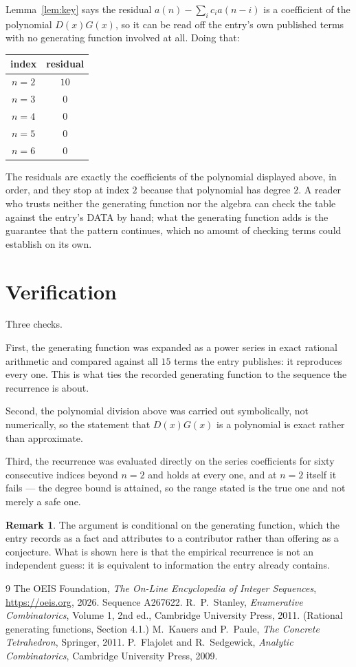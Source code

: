 \documentclass[11pt,a4paper]{article}
\theoremstyle{plain}
\theoremstyle{definition}
\newtheorem{remark}[theorem]{Remark}
\begin{document}
Lemma~\ref{lem:key} says the residual $a(n)-\sum_ic_ia(n-i)$ is a coefficient of the
polynomial $D(x)G(x)$, so it can be read off the entry's own published terms with no
generating function involved at all. Doing that:
\begin{center}
\begin{tabular}{cc}
index & residual \\ \hline
$n=2$ & $10$ \\
$n=3$ & $0$ \\
$n=4$ & $0$ \\
$n=5$ & $0$ \\
$n=6$ & $0$
\end{tabular}
\end{center}
The residuals are exactly the coefficients of the polynomial displayed above, in order, and
they stop at index $2$ because that polynomial has degree $2$. A reader who trusts
neither the generating function nor the algebra can check the table against the entry's DATA
by hand; what the generating function adds is the guarantee that the pattern continues, which
no amount of checking terms could establish on its own.

\section{Verification}

Three checks.

First, the generating function was expanded as a power series in exact rational arithmetic and
compared against all $15$ terms the entry publishes: it reproduces every one. This is
what ties the recorded generating function to the sequence the recurrence is about.

Second, the polynomial division above was carried out symbolically, not numerically, so the
statement that $D(x)G(x)$ is a polynomial is exact rather than approximate.

Third, the recurrence was evaluated directly on the series coefficients for sixty consecutive
indices beyond $n=2$ and holds at every one, and at $n=2$ itself it fails --- the
degree bound is attained, so the range stated is the true one and not merely a safe one.

\begin{remark}
The argument is conditional on the generating function, which the entry records as a fact and
attributes to a contributor rather than offering as a conjecture. What is shown here is that
the empirical recurrence is not an independent guess: it is equivalent to information the
entry already contains.
\end{remark}

\begin{thebibliography}{9}
 The OEIS Foundation, \emph{The On-Line Encyclopedia of Integer
Sequences}, \url{https://oeis.org}, 2026. Sequence A267622.
 R.~P.~Stanley, \emph{Enumerative Combinatorics}, Volume 1, 2nd ed.,
Cambridge University Press, 2011. (Rational generating functions, Section 4.1.)
 M.~Kauers and P.~Paule, \emph{The Concrete Tetrahedron}, Springer, 2011.
 P.~Flajolet and R.~Sedgewick, \emph{Analytic Combinatorics}, Cambridge
University Press, 2009.
\end{thebibliography}
\end{document}
